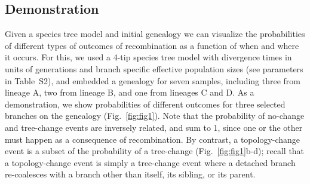 \documentclass[11pt]{article}
\begin{document}

\subsection{Demonstration}
Given a species tree model and initial genealogy we can visualize the 
probabilities of different types of outcomes of recombination as a 
function of when and where it occurs.
For this, we used a 4-tip species tree model with divergence times in 
units of generations and branch specific effective population sizes 
(see parameters in Table~S2), and embedded a genealogy for seven samples, 
including three from lineage A, two from lineage B, and one from lineages 
C and D. 
As a demonstration, we show probabilities of different outcomes for 
three selected branches on the genealogy (Fig.~\ref{fig:fig1}). 
Note that the probability of no-change and tree-change events are inversely
related, and sum to 1, since one or the other must happen as a consequence 
of recombination. By contrast, a topology-change event is a subset of the 
probability of a tree-change (Fig.~\ref{fig:fig1}b-d);  
recall that a topology-change event is simply a tree-change event
where a detached branch re-coalesces with a branch other than itself, 
its sibling, or its parent.

\end{document}
